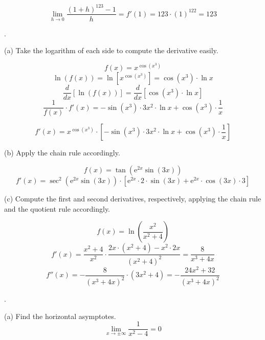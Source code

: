 \documentclass{article}
\begin{document}
\[\lim_{h\to0}\frac{(1+h)^{123}-1}{h}=f'(1)=123\cdot(1)^{122} = \boxed{123}\]

\newpage

.

\hfill

\noindent (a) Take the logarithm of each side to compute the derivative easily.

\[f(x)=x^{\cos\left(x^3\right)}\]
\[\ln(f(x))=\ln\left[x^{\cos\left(x^3\right)}\right]=\cos\left(x^3\right)\cdot\ln x\]
\[\frac{d}{dx}\left[\ln(f(x))\right] = \frac{d}{dx}\left[\cos\left(x^3\right)\cdot\ln x\right]\]
\[\frac{1}{f(x)}\cdot f'(x) = -\sin\left(x^3\right)\cdot 3x^2 \cdot \ln x + \cos\left(x^3\right)\cdot\frac1x\]

\[\boxed{f'(x) = x^{\cos\left(x^3\right)}\cdot\left[-\sin\left(x^3\right)\cdot 3x^2 \cdot \ln x + \cos\left(x^3\right)\cdot\frac1x\right]}\]

\hfill

\noindent (b) Apply the chain rule accordingly.

\begin{equation*}f(x) = \tan\left(\mathrm{e}^{2x}\sin(3x)\right)\end{equation*}
\begin{equation*}\boxed{f'(x) = \sec^2\left(\mathrm{e}^{2x}\sin(3x)\right)\cdot\left[\mathrm{e}^{2x}\cdot 2\cdot\sin(3x) + \mathrm{e}^{2x}\cdot\cos(3x)\cdot3\right]}\end{equation*}

\noindent (c) Compute the first and second derivatives, respectively, applying the chain rule and the quotient rule accordingly.

\begin{equation*}f(x) = \ln\left(\frac{x^2}{x^2+4}\right)\end{equation*}
\begin{equation*}f'(x)= \frac{x^2+4}{x^2}\cdot\frac{2x\cdot(x^2+4)-x^2\cdot2x}{\left(x^2+4\right)^2}=\frac{8}{x^3+4x}\end{equation*}
\begin{equation*}f''(x)= -\frac{8}{\left(x^3+4x\right)^2}\cdot\left(3x^2+4\right)=\boxed{-\frac{24x^2+32}{\left(x^3+4x\right)^2}}\end{equation*}

\hfill

.

\hfill

\noindent (a) Find the horizontal asymptotes.
\[\lim_{x\to\pm\infty}\frac{1}{x^2-4}=0\]
\end{document}
